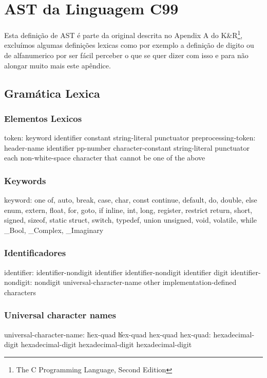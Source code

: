 \chapter{AST da Linguagem \textrm{C99}}\label{chap:ast}
\minitoc
Esta definição de AST é parte da original descrita no Apendix A do K\&R\footnote{The C Programming Language, Second Edition}, excluímos algumas definições lexicas
como por exemplo a definição de digito ou de alfanumerico por ser fácil perceber o que se quer dizer com isso e para não alongar muito mais este apêndice.
\section{Gramática Lexica}
\subsection{Elementos Lexicos}

\begin{code_files}
token:
	keyword
	identifier
	constant
	string-literal
	punctuator
preprocessing-token:
	header-name
	identifier
	pp-number
	character-constant
	string-literal
	punctuator
	each non-white-space character that cannot be one of the above
\end{code_files}

\subsection{Keywords}
\begin{code_files}
keyword:
	one of, auto, break, case, char, const
	continue, default, do, double, else
	enum, extern, float, for, goto, if
	inline, int, long, register, restrict
	return, short, signed, sizeof, static
	struct, switch, typedef, union
	unsigned, void, volatile, while
	_Bool, _Complex, _Imaginary
\end{code_files}

\subsection{Identificadores}
\begin{code_files}
identifier:
	identifier-nondigit
	identifier identifier-nondigit
	identifier digit
identifier-nondigit:
	nondigit
	universal-character-name
	other implementation-defined characters
\end{code_files}

\subsection{Universal character names}
\begin{code_files}
universal-character-name:
	\u hex-quad
	\U hex-quad hex-quad
hex-quad:
	hexadecimal-digit hexadecimal-digit
	hexadecimal-digit hexadecimal-digit
\end{code_files}

